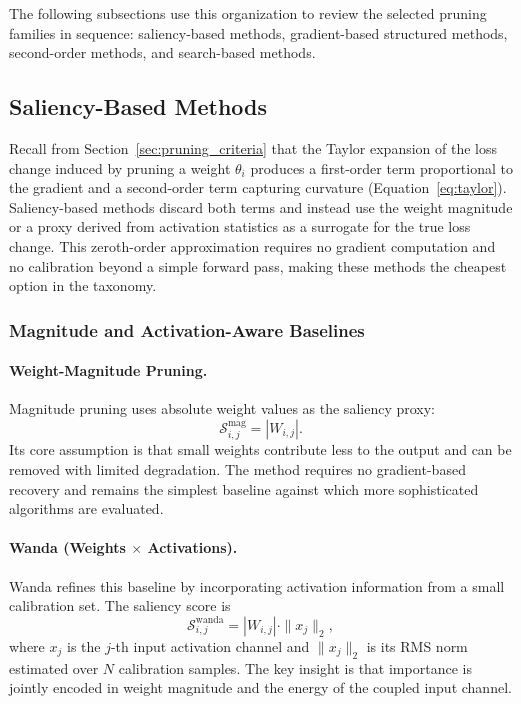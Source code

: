 The following subsections use this organization to review the selected pruning families in sequence: saliency-based methods, gradient-based structured methods, second-order methods, and search-based methods.

\clearpage
\subsection{Saliency-Based Methods}

Recall from Section~\ref{sec:pruning_criteria} that the Taylor expansion of the
loss change induced by pruning a weight $\theta_i$ produces a first-order term
proportional to the gradient and a second-order term capturing curvature
(Equation~\eqref{eq:taylor}). Saliency-based methods discard both terms and
instead use the weight magnitude or a proxy derived from activation statistics
as a surrogate for the true loss change. This zeroth-order approximation
requires no gradient computation and no calibration beyond a simple forward
pass, making these methods the cheapest option in the taxonomy.

\subsubsection{Magnitude and Activation-Aware Baselines}

\paragraph{Weight-Magnitude Pruning.}
Magnitude pruning uses absolute weight values as the saliency proxy:
\begin{equation}
	\mathcal{S}^{\mathrm{mag}}_{i,j} = |W_{i,j}|.
\end{equation}
Its core assumption is that small weights contribute less to the output and can be removed with limited degradation. The method requires no gradient-based recovery and remains the simplest baseline against which more sophisticated algorithms are evaluated.

\methodsep

\paragraph{Wanda (Weights $\times$ Activations).}
Wanda \cite{sun2023simple} refines this baseline by incorporating activation information from a small calibration set. The saliency score is
\begin{equation}
	\mathcal{S}^{\mathrm{wanda}}_{i,j} = |W_{i,j}| \cdot \|x_j\|_2,
\end{equation}
where $x_j$ is the $j$-th input activation channel and $\|x_j\|_2$ is its RMS norm estimated over $N$ calibration samples. The key insight is that importance is jointly encoded in weight magnitude and the energy of the coupled input channel.

